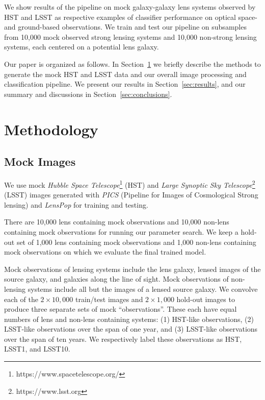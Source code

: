 \documentclass{emulateapj}
\begin{document}
We show results of the pipeline on mock galaxy-galaxy lens systems
observed by HST and LSST as respective examples of classifier
performance on optical space- and ground-based observations.  We train
and test our pipeline on subsamples from 10,000 mock observed strong
lensing systems and 10,000 non-strong lensing systems, each centered
on a potential lens galaxy.

Our paper is organized as follows. In Section~\ref{sec:methods} we
briefly describe the methods to generate the mock HST and LSST data
and our overall image processing and classification pipeline. We
present our results in Section~\ref{sec:results}, and our summary and
discussions in Section~\ref{sec:conclusions}.

\section{Methodology}
\label{sec:methods}
\subsection{Mock Images}
We use mock {\em Hubble Space
  Telescope}\footnote{https://www.spacetelescope.org/} (HST) and {\em
  Large Synoptic Sky Telescope}\footnote{https://www.lsst.org} (LSST)
images generated with {\em PICS} (Pipeline for Images of Cosmological
Strong lensing) \citep{li_etal16} and {\em LensPop} \citep{collett_15}
for training and testing.

There are 10,000 lens containing mock observations and 10,000
non-lens containing mock observations for running our parameter search. 
We keep a hold-out set of 1,000 lens containing mock observations
and 1,000 non-lens containing mock observations on which we evaluate
the final trained model.

Mock observations of lensing systems include the lens galaxy, lensed
images of the source galaxy, and galaxies along the line of sight.
Mock observations of non-lensing systems include all but the images of
a lensed source galaxy.  We convolve each of the $2\times 10,000$
train/test images and $2\times 1,000$ hold-out images to produce three
separate sets of mock ``observations''.  These each have equal numbers
of lens and non-lens containing systems: (1) HST-like observations,
(2) LSST-like observations over the span of one year, and (3)
LSST-like observations over the span of ten years.  We respectively
label these observations as HST, LSST1, and LSST10.
\end{document}

